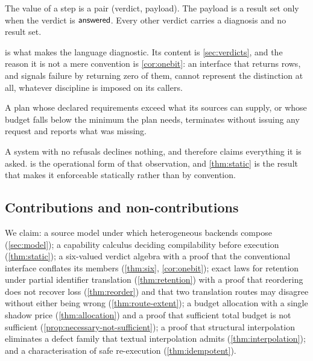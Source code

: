 \begin{principle}
\label{prin:verdict}
The value of a step is a pair (verdict, payload). The payload is a result set
only when the verdict is $\textsf{answered}$. Every other verdict carries a diagnosis and
no result set.
\end{principle}

 is what makes the language diagnostic. Its content is
\cref{sec:verdicts}, and the reason it is not a mere convention is
\cref{cor:onebit}: an interface that returns rows, and signals failure by
returning zero of them, cannot represent the distinction at all, whatever
discipline is imposed on its callers.

\begin{principle}
\label{prin:refusal}
A plan whose declared requirements exceed what its sources can supply, or whose
budget falls below the minimum the plan needs, terminates without issuing any
request and reports what was missing.
\end{principle}

A system with no refusals declines nothing, and therefore claims everything it
is asked.  is the operational form of that observation, and
\cref{thm:static} is the result that makes it enforceable statically rather
than by convention.

\subsection{Contributions and non-contributions}

We claim: a source model under which heterogeneous backends compose
(\cref{sec:model}); a capability calculus deciding compilability before
execution (\cref{thm:static}); a six-valued verdict algebra with a proof that
the conventional interface conflates its members (\cref{thm:six},
\cref{cor:onebit}); exact laws for retention under partial identifier
translation (\cref{thm:retention}) with a proof that reordering does not
recover loss (\cref{thm:reorder}) and that two translation routes may disagree
without either being wrong (\cref{thm:route-extent}); a budget allocation with
a single shadow price (\cref{thm:allocation}) and a proof that sufficient total
budget is not sufficient (\cref{prop:necessary-not-sufficient}); a proof that
structural interpolation eliminates a defect family that textual interpolation
admits (\cref{thm:interpolation}); and a characterisation of safe re-execution
(\cref{thm:idempotent}).

